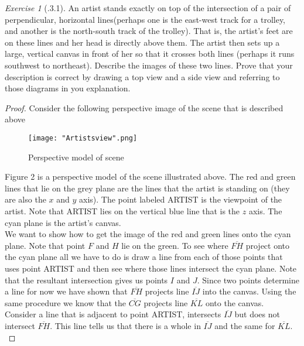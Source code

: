 \documentclass[12pt]{amsart}
\theoremstyle{remark}
\newtheorem*{exercise}{Exercise}%
\theoremstyle{mycomment}
\begin{document}
\begin{exercise}[\Box.3.1] 
An artist stands exactly on top of the intersection of a pair of perpendicular, horizontal lines(perhaps one is the east-west track for a trolley, and another is the north-south track of the trolley). That is, the artist's feet are on these lines and her head is directly above them.
The artist then sets up a large, vertical canvas in front of her so that it crosses both lines (perhaps it runs southwest to northeast).
Describe the images of these two lines. Prove that your description is correct by drawing a top view and a side view and referring to those diagrams in you explanation. 

\begin{proof} Consider the following perspective image of the scene that is described above
\begin{figure}[H]
\caption{Perspective model of scene}
\centering
\texttt{[image: "Artistsview".png]}
\end{figure}
 Figure 2 is a perspective model of the scene illustrated above. The red and green lines that lie on the grey plane are the lines that the artist is standing on (they are also the $x$ and $y$ axis). The point labeled ARTIST is the viewpoint of the artist. Note that ARTIST lies on the vertical blue line that is the $z$ axis. The cyan plane is the artist's canvas.\\
 
We want to show how to get the image of the red and green lines onto the cyan plane. Note that point $F$ and $H$ lie on the green. To see where $\overline{FH}$ project onto the cyan plane all we have to do is draw a line from each of those points that uses point ARTIST and then see where those lines intersect the cyan plane. Note that the resultant intersection gives us points $I$ and $J$. Since two points determine a line for now we have shown that $\overline{FH}$ projects line $\overline{IJ}$ into the canvas. Using the same procedure we know that the $\overline{CG}$ projects line $\overline{KL}$ onto the canvas. \\
 
 Consider a line that is adjacent to point ARTIST, intersects $\overline{IJ}$ but does not intersect $\overline{FH}$. This line tells us that there is a whole in $\overline{IJ}$ and the same for  $\overline{KL}$. \\
 

\end{proof}
\end{exercise}
\end{document}
